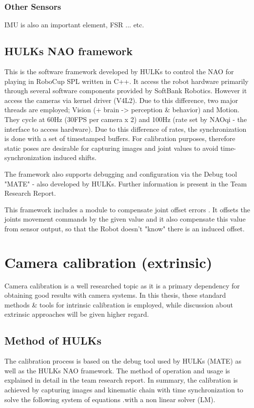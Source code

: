 \documentclass[english, printversion, nomenclature, notitle]{tuvisionthesis} %
\begin{document}
\subsubsection{Other Sensors}
IMU is also an important element, FSR ... etc. 

\subsection{HULKs NAO framework}
This is the software framework developed by HULKs to control the NAO for playing in RoboCup SPL written in C++. It access the robot hardware primarily through several software components provided by SoftBank Robotics. However it access the cameras via kernel driver (V4L2). Due to this difference, two major threads are employed; Vision (+ brain -> perception \& behavior) and Motion. They cycle at 60Hz (30FPS per camera x 2) and 100Hz (rate set by NAOqi - the interface to access hardware). Due to this difference of rates, the synchronization is done with a set of timestamped buffers. For calibration purposes, therefore static poses are desirable for capturing images and joint values to avoid time-synchronization induced shifts. 

The framework also supports debugging and configuration via the Debug tool "MATE" - also developed by HULKs. Further information is present in the Team Research Report.

This framework includes a module to compensate joint offset errors . It offsets the joints movement commands by the given value and it also compensate this value from sensor output, so that the Robot doesn't "know" there is an induced offset. 

\section{Camera calibration (extrinsic)}
Camera calibration is a well researched topic as it is a primary dependency for obtaining good results with camera systems. In this thesis, these standard methods \& tools for intrinsic calibration is employed, while discussion about extrinsic approaches will be given higher regard.

\subsection{Method of HULKs}

The calibration process is based on the debug tool used by HULKs (MATE) as well as the HULKs NAO framework. The method of operation and usage is explained in detail in the team research report. In summary, the calibration is achieved by capturing images and kinematic chain with time synchronization to solve the following system of equations .with a non linear solver (LM).
\end{document}
